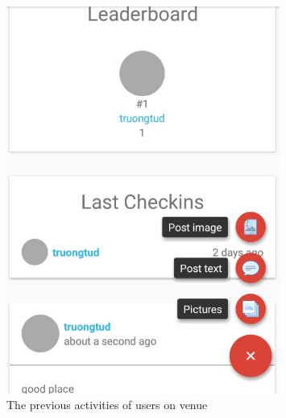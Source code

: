 \begin{figure}[htbp]
	\includegraphics[width=0.8\textwidth]{images/venueInDetail_Part_2.jpg}
	\centering
	\caption[]{The previous activities of users on venue}
	\label{fig:previous_activities}
\end{figure}


